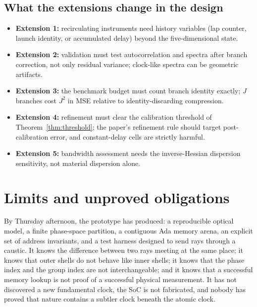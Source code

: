 \documentclass[11pt]{article}
\begin{document}
\subsection{What the extensions change in the design}

\begin{itemize}[nosep]
\item \textbf{Extension 1:} recirculating instruments need history variables (lap counter,
launch identity, or accumulated delay) beyond the five-dimensional state.
\item \textbf{Extension 2:} validation must test autocorrelation and spectra after branch
correction, not only residual variance; clock-like spectra can be geometric artifacts.
\item \textbf{Extension 3:} the benchmark budget must count branch identity exactly;
$J$ branches cost $J^2$ in MSE relative to identity-discarding compression.
\item \textbf{Extension 4:} refinement must clear the calibration threshold
of Theorem~\ref{thm:threshold}; the paper's refinement rule should target
post-calibration error, and constant-delay cells are strictly harmful.
\item \textbf{Extension 5:} bandwidth assessment needs the inverse-Hessian dispersion
sensitivity, not material dispersion alone.
\end{itemize}

\section{Limits and unproved obligations}\label{sec:limits}

By Thursday afternoon, the prototype has produced: a reproducible optical model, a finite
phase-space partition, a contiguous Ada memory arena, an explicit set of address
invariants, and a test harness designed to send rays through a caustic. It knows the
difference between two rays meeting at the same place; it knows that outer shells do not
behave like inner shells; it knows that the phase index and the group index are not
interchangeable; and it knows that a successful memory lookup is not proof of a
successful physical measurement. It has not discovered a new fundamental clock, the SoC
is not fabricated, and nobody has proved that nature contains a subtler clock beneath the
atomic clock.
\end{document}
